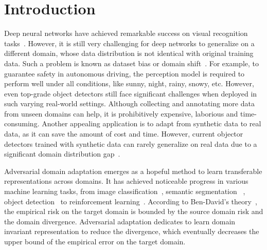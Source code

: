 \documentclass[runningheads]{llncs}
\begin{document}
\section{Introduction}
Deep neural networks have achieved remarkable success on visual recognition tasks~\cite{girshick2014rich,he2016deep}.
However, it is still very challenging for deep networks to generalize on a different domain, whose data distribution is not identical with original training data.
Such a problem is known as dataset bias or domain shift~\cite{quionero2009dataset}.
For example, to guarantee safety in autonomous driving, the perception model is required to perform well under all conditions, like sunny, night, rainy, snowy, etc.
However, even top-grade object detectors still face significant challenges when deployed in such varying real-world settings.
Although collecting and annotating more data from unseen domains can help, it is prohibitively expensive, laborious and time-consuming.
Another appealing application is to adapt from synthetic data to real data, as it can save the amount of cost and time.
However, current objector detectors trained with synthetic data can rarely generalize on real data due to a significant domain distribution gap~\cite{Peng2018Syn2RealAN,sankaranarayanan2018learning,tobin2017domain}.

Adversarial domain adaptation emerges as a hopeful method to learn transferable representations across domains.
It has achieved noticeable progress in various machine learning tasks, from image classification~\cite{liu2019compound,long2018conditional,Peng_2019_ICCV}, semantic segmentation ~\cite{sankaranarayanan2018learning,tsai2019domain,zou2018unsupervised}, object detection~\cite{Saito_2019_CVPR,Zhu_2019_CVPR} to reinforcement learning~\cite{james2019sim,peng2018sim,tobin2017domain}.
According to Ben-David's theory~\cite{ben2010theory}, the empirical risk on the target domain is bounded by the source domain risk and the   domain divergence.
Adversarial adaptation dedicates to learn domain invariant representation to reduce the   divergence, which eventually decreases the upper bound of the empirical error on the target domain.
\end{document}
